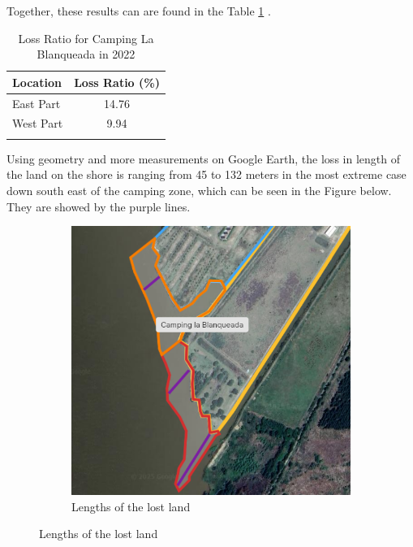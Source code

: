 Together, these results can are found in the Table \ref{Table:Loss Ratio for Camping La Blanqueada in 2022} .

\begin{table}[H]
\centering
\caption{Loss Ratio for Camping La Blanqueada in 2022}
\label{tab:LossRatio}
\begin{tabular}{l c}
\toprule
Location & Loss Ratio (\%) \\
\midrule
East Part & 14.76 \\
West Part & 9.94 \\
\bottomrule
\label{Table:Loss Ratio for Camping La Blanqueada in 2022}
\end{tabular}
\end{table}


Using geometry and more measurements on Google Earth, the loss in length of the land on the shore is ranging from 45 to 132 meters in the most extreme case down south east of the camping zone, which can be seen in the Figure below. They are showed by the purple lines.

\begin{figure}[H]
    \centering
    \begin{subfigure}[b]{0.48\textwidth}
        \includegraphics[width=\linewidth, height =6
        cm]{figures/appendix-g/length.png}
        \caption{Lengths of the lost land}
        \label{fig:second}
    \end{subfigure}
\end{figure}
